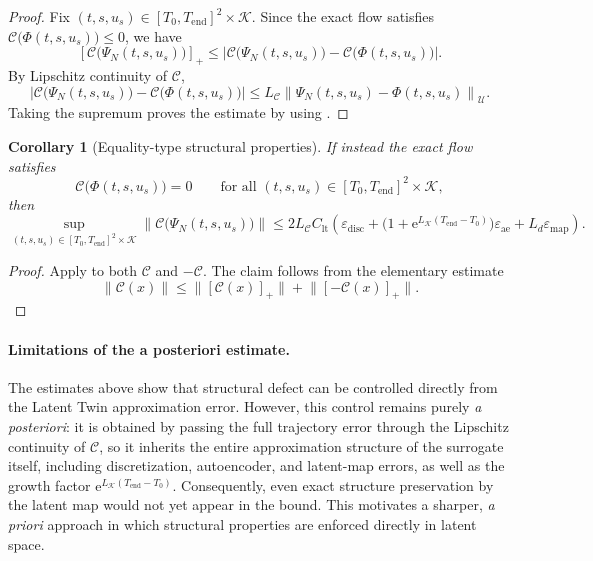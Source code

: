 \documentclass[a4paper,fleqn]{cas-sc}
\theoremstyle{thmstyleone}%
\theoremstyle{thmstyletwo}%
\newtheorem{corollary}{Corollary}%
\theoremstyle{thmstylethree}%
\begin{document}
\begin{proof}
Fix $(t,s,u_s)\in[T_0,T_{\mathrm{end}}]^2\times\mathcal{K}$. Since the exact flow satisfies $\mathcal{C}\bigl(\Phi(t,s,u_s)\bigr)\leq 0$, we have
\[
    \left[ \mathcal{C}\bigl(\Psi_{N}(t,s,u_s)\bigr) \right]_+ \leq \left| \mathcal{C}\bigl(\Psi_{N}(t,s,u_s)\bigr) - \mathcal{C}\bigl(\Phi(t,s,u_s)\bigr) \right|.
\]
By Lipschitz continuity of $\mathcal C$,
\[
    \left| \mathcal{C}\bigl(\Psi_{N}(t,s,u_s)\bigr) - \mathcal{C}\bigl(\Phi(t,s,u_s)\bigr) \right| \leq L_{\mathcal C} \left\| \Psi_{N}(t,s,u_s)-\Phi(t,s,u_s) \right\|_{\mathcal U}.
\]
Taking the supremum proves the estimate by using .
\end{proof}

\begin{corollary}[Equality-type structural properties]
\label{cor:equality-constraint}
If instead the exact flow satisfies
$$
\mathcal{C}\bigl(\Phi(t,s,u_s)\bigr)=0
\qquad \text{for all } (t,s,u_s)\in[T_0,T_{\mathrm{end}}]^2\times\mathcal{K},
$$
then
$$
\sup_{(t,s,u_s)\in[T_0,T_{\mathrm{end}}]^2\times\mathcal{K}}
\left\|
\mathcal{C}\bigl({\Psi}_{N}(t,s,u_s)\bigr)
\right\|
\leq
2L_{\mathcal{C}}C_{\mathrm{lt}}
\left(
\varepsilon_{\mathrm{disc}}
+
\bigl(1+\mathrm{e}^{L_{\mathcal K}(T_{\mathrm{end}}-T_0)}\bigr)\varepsilon_{\mathrm{ae}}
+
L_{d}\varepsilon_{\mathrm{map}}
\right).
$$
\end{corollary}

\begin{proof}
Apply  to both $\mathcal{C}$ and $-\mathcal{C}$. The claim follows from the elementary estimate
$$
\|\mathcal{C}(x)\|
\leq
\bigl\|[\mathcal C(x)]_+\bigr\|
+
\bigl\|[-\mathcal C(x)]_+\bigr\|.
$$
\end{proof}

\paragraph{Limitations of the a posteriori estimate.}
The estimates above show that structural defect can be controlled directly from the Latent Twin approximation error. However, this control remains purely \emph{a posteriori}: it is obtained by passing the full trajectory error through the Lipschitz continuity of $\mathcal{C}$, so it inherits the entire approximation structure of the surrogate itself, including discretization, autoencoder, and latent-map errors, as well as the growth factor $\mathrm e^{L_{\mathcal K}(T_{\mathrm{end}}-T_0)}$. Consequently, even exact structure preservation by the latent map would not yet appear in the bound. This motivates a sharper, \emph{a priori} approach in which structural properties are enforced directly in latent space.
\end{document}

